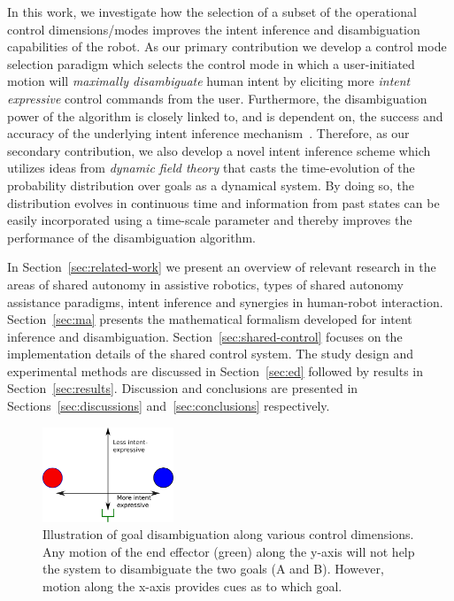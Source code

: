 \documentclass[natbib, twocolumn]{svjour3}          %
\begin{document}
In this work, we investigate how the selection of a subset of the operational control dimensions/modes improves the intent inference and disambiguation capabilities of the robot. As our primary contribution we develop a control mode selection paradigm which selects the control mode in which a user-initiated motion will \textit{maximally disambiguate }human intent by eliciting more \textit{intent expressive} control commands from the user.  Furthermore, the disambiguation power of the algorithm is closely linked to, and is dependent on, the success and accuracy of the underlying intent inference mechanism~\citep{gopinath2017mode}. Therefore, as our secondary contribution, we also develop a novel intent inference scheme which utilizes ideas from \textit{dynamic field theory} that casts the time-evolution of the probability distribution over goals as a dynamical system. By doing so, the distribution evolves in continuous time and information from past states can be easily incorporated using a time-scale parameter and thereby improves the performance of the disambiguation algorithm.

In Section~\ref{sec:related-work} we present an overview of relevant research in the areas of shared autonomy in assistive robotics, types of shared autonomy assistance paradigms, intent inference and synergies in human-robot interaction. Section~\ref{sec:ma} presents the mathematical formalism developed for intent inference and disambiguation. Section~\ref{sec:shared-control} focuses on the implementation details of the shared control system. The study design and experimental methods are discussed in Section~\ref{sec:ed} followed by results in Section~\ref{sec:results}. Discussion and conclusions are presented in Sections~\ref{sec:discussions} and~\ref{sec:conclusions} respectively. 
\begin{figure}
	\begin{center}
		\includegraphics[width=0.35\textwidth]{Fig2.eps}
	\end{center}
	\caption{Illustration of goal disambiguation along various control dimensions. Any motion of the end effector (green) along the y-axis will not help the system to disambiguate the two goals (A and B). However, motion along the x-axis provides cues as to which goal.}
	\label{fig:disamb}
\end{figure}
\end{document}
